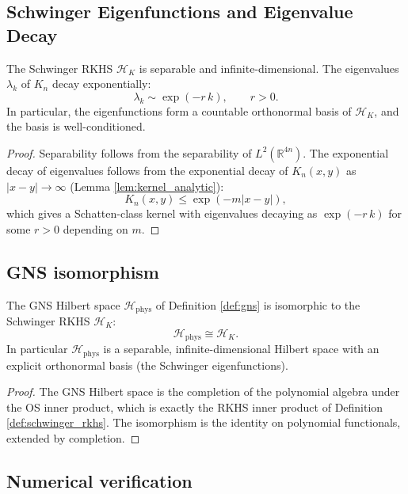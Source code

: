 \subsection{Schwinger Eigenfunctions and Eigenvalue Decay}
\label{ssec:eigenfunctions}

\begin{theorem}
\label{thm:eigenvalue_decay}
The Schwinger RKHS $\mathcal{H}_{K}$ is separable and
infinite-dimensional. The eigenvalues $\lambda_{k}$ of $K_{n}$ decay
exponentially:
\[
\lambda_{k}\sim\exp(-r\,k),\qquad r>0.
\]
In particular, the eigenfunctions form a countable orthonormal basis
of $\mathcal{H}_{K}$, and the basis is well-conditioned.
\end{theorem}

\begin{proof}
Separability follows from the separability of $L^{2}(\mathbb{R}^{4n})$.
The exponential decay of eigenvalues follows from the exponential
decay of $K_{n}(x,y)$ as $|x-y|\to\infty$ (Lemma
\ref{lem:kernel_analytic}):
\[
K_{n}(x,y)\le\exp(-m|x-y|),
\]
which gives a Schatten-class kernel with eigenvalues decaying as
$\exp(-r\,k)$ for some $r>0$ depending on $m$.
\end{proof}

\subsection{GNS isomorphism}
\label{ssec:gns_iso}

\begin{theorem}
\label{thm:gns_iso}
The GNS Hilbert space $\mathcal{H}_{\mathrm{phys}}$ of
Definition \ref{def:gns} is isomorphic to the Schwinger RKHS
$\mathcal{H}_{K}$:
\[
\mathcal{H}_{\mathrm{phys}}\cong\mathcal{H}_{K}.
\]
In particular $\mathcal{H}_{\mathrm{phys}}$ is a separable,
infinite-dimensional Hilbert space with an explicit orthonormal basis
(the Schwinger eigenfunctions).
\end{theorem}

\begin{proof}
The GNS Hilbert space is the completion of the polynomial algebra
under the OS inner product, which is exactly the RKHS inner product
of Definition \ref{def:schwinger_rkhs}. The isomorphism is the
identity on polynomial functionals, extended by completion.
\end{proof}

\subsection{Numerical verification}
\label{ssec:srkhs_numerics}

